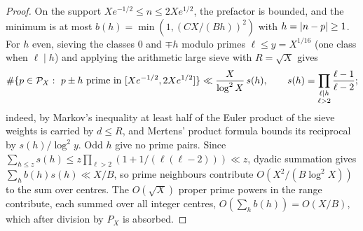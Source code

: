 \begin{proof}
On the support $Xe^{-1/2}\le n\le2Xe^{1/2}$, the prefactor is bounded, and the minimum is at most
$b(h)=\min(1,(CX/(Bh))^2)$ with $h=\lvert n-p\rvert\ge1$. For $h$ even, sieving the classes $0$ and $\mp h$
modulo primes $\ell\le y=X^{1/16}$ (one class when $\ell\mid h$) and applying the arithmetic large sieve
\cite{Montgomery1973Large} with $R=\sqrt X$ gives
\[
 \#\{p\in\mathcal P_X:\ p\pm h\text{ prime in }[Xe^{-1/2},2Xe^{1/2}]\}\ll\frac X{\log^2X}\,s(h),\qquad
 s(h)=\prod_{\substack{\ell\mid h\\\ell>2}}\frac{\ell-1}{\ell-2};
\]
indeed, by Markov's inequality at least half of the Euler product of the sieve weights is carried by
$d\le R$, and Mertens' product formula bounds its reciprocal by $s(h)/\log^2y$. Odd $h$ give no prime
pairs. Since $\sum_{h\le z}s(h)\le z\prod_{\ell>2}(1+1/(\ell(\ell-2)))\ll z$, dyadic summation gives
$\sum_hb(h)s(h)\ll X/B$, so prime neighbours contribute $O(X^2/(B\log^2X))$ to the sum over centres.
The $O(\sqrt X)$ proper prime powers in the range contribute, each summed over all integer centres,
$O(\sum_hb(h))=O(X/B)$, which after division by $P_X$ is absorbed.
\end{proof}

